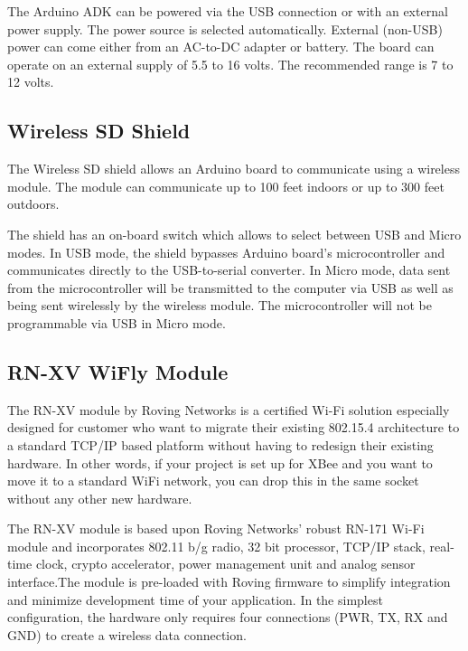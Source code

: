 The Arduino ADK can be powered via the USB connection or with an external power supply. The power source is selected automatically. External (non-USB) power can come either from an AC-to-DC adapter or battery. The board can operate on an external supply of 5.5 to 16 volts. The recommended range is 7 to 12 volts.


\subsection{Wireless SD Shield}

The Wireless SD shield \cite{arduino_wireless} allows an Arduino board to communicate using a wireless module. The module can communicate up to 100 feet indoors or up to 300 feet outdoors. 

The shield has an on-board switch which allows to select between USB and Micro modes. In USB mode, the shield bypasses Arduino board's microcontroller and communicates directly to the USB-to-serial converter. In Micro mode, data sent from the microcontroller will be transmitted to the computer via USB as well as being sent wirelessly by the wireless module. The microcontroller will not be programmable via USB in Micro mode.

\subsection{RN-XV WiFly Module}

The RN-XV module \cite{rn_xv_module} by Roving Networks is a certified Wi-Fi solution especially designed for customer who want to migrate their existing 802.15.4 architecture to a standard TCP/IP based platform without having to redesign their existing hardware. In other words, if your project is set up for XBee and you want to move it to a standard WiFi network, you can drop this in the same socket without any other new hardware.

The RN-XV module is based upon Roving Networks' robust RN-171 Wi-Fi module and incorporates 802.11 b/g radio, 32 bit processor, TCP/IP stack, real-time clock, crypto accelerator, power management unit and analog sensor interface.The module is pre-loaded with Roving firmware to simplify integration and minimize development time of your application. In the simplest configuration, the hardware only requires four connections (PWR, TX, RX and GND) to create a wireless data connection.


